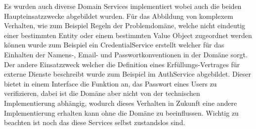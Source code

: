 
Es wurden auch diverse Domain Services implementiert wobei auch die beiden Haupteinsatzzwecke abgebildet wurden.
Für das Abbildung von komplexem Verhalten, wie zum Beispiel Regeln der Problemdomäne, welche nicht eindeutig einer bestimmten Entity oder einem bestimmten Value Object zugeordnet werden können
wurde zum Beispiel ein CredentialService erstellt welcher für das Einhalten der Namens-, Email- und Passwortkonventionen in der Domäne sorgt.
Der andere Einsatzzweck welcher die Definition eines Erfüllungs-Vertrages für externe Dienste beschreibt wurde zum Beispiel im AuthService abgebildet.
Dieser bietet in einem Interface die Funktion an, das Passwort eines Users zu verifizieren, dabei ist die Domäne aber nicht von der technischen Implementierung abhängig,
wodurch dieses Verhalten in Zukunft eine andere Implementierung erhalten kann ohne die Domäne zu beeinflussen.
Wichtig zu beachten ist noch das diese Services selbst zustandslos sind.


